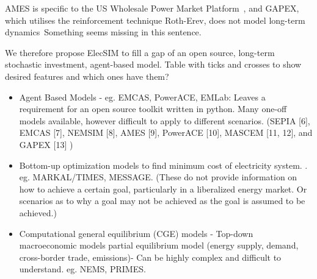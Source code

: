 AMES is specific to the US Wholesale Power Market Platform~\cite{Sun2007}, and GAPEX, which utilises the reinforcement technique Roth-Erev, does not model long-term dynamics~\cite{Cincotti2013}{\color{red}Something seems missing in this sentence}. 

We therefore propose ElecSIM to fill a gap of an open source, long-term stochastic investment, agent-based model. {\color{red}Table with ticks and crosses to show desired features and which ones have them?}

\begin{itemize}
	\item Agent Based Models - eg. EMCAS, PowerACE, EMLab: Leaves a requirement for an open source toolkit written in python. Many one-off models available, however difficult to apply to different scenarios.
	(SEPIA [6], EMCAS [7], NEMSIM [8], AMES [9], PowerACE [10], MASCEM [11, 12], and GAPEX [13] \cite{Lopes})
	\item Bottom-up optimization models to find minimum cost of electricity system. \cite{Pfenninger2014}. eg. MARKAL/TIMES, MESSAGE. (These do not provide information on how to achieve a certain goal, particularly in a liberalized energy market. Or scenarios as to why a goal may not be achieved as the goal is assumed to be achieved.)
	\item Computational general equilibrium (CGE) models - Top-down macroeconomic models partial equilibrium model (energy supply, demand, cross-border trade, emissions)- Can be highly complex and difficult to understand. eg. NEMS, PRIMES.
\end{itemize}



